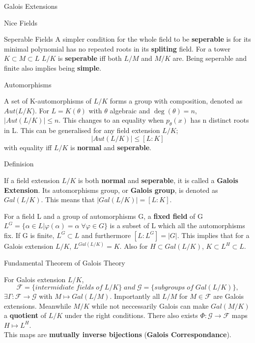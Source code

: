 \documentclass[12pt, letterpaper]{article}
\begin{document}
\begin{section}{Galois Extensions}
\begin{subsection}{Nice Fields}
\begin{subsubsection}{Seperable Fields}
      A simpler condition for the whole field to be \textbf{seperable} is for
      its minimal polynomial has no repeated roots in its \textbf{spliting}
      field. For a tower \(K \subset M \subset L\) \(L / K\) is \textbf{seperable}
      iff both \(L / M\) and \(M / K\) are. Being seperable and finite also
      implies being \textbf{simple}. \\

      \end{subsubsection}

  \end{subsection}

  \begin{subsection}{Automorphisms}

    A set of K-automorphisms of \(L / K\) forms a group with composition,
    denoted as \(Aut(L / K\)). For \(L = K(\theta)\) with \(\theta\) algebraic
    and \(\deg(\theta) = n\), \(|Aut(L / K)| \leq n\). This changes to an
    equality when \(p_{\theta}(x)\) has n distinct roots in L. This can be
    generalised for any field extension \(L / K\); \[|Aut(L / K)| \leq [L : K]\]
    with equality iff \(L / K\) is \textbf{normal} and \textbf{seperable}.

  \end{subsection}

  \begin{subsection}{Definision}

    If a field extension \(L / K\) is both \textbf{normal} and
    \textbf{seperable}, it is called a \textbf{Galois Extension}. Its
    automorphisms group, or \textbf{Galois group}, is denoted as \(Gal(L / K)\).
    This means that \(|Gal(L / K)| = [L : K]\).

    For a field L and a group of automorphisms G, a \textbf{fixed field} of G
    \(L^{G} = \{ \alpha \in L | \varphi(\alpha) = \alpha \; \forall \varphi \in
    G\}\) is a subset of L which all the automorphisms fix. If G is finite,
    \(L^{G} \subset L\) and furthermore \([L : L^{G}] = |G|\). This implies
    that for a Galois extension \(L / K\), \(L^{Gal(L / K)} = K\). Also for \(H
    \subset Gal(L / K)\), \(K \subset L^{H} \subset L\).

    \begin{subsubsection}{Fundamental Theorem of Galois Theory}

      For Galois extension \(L / K\), \[\mathcal{F} = \{ intermidiate \; fields
        \; of \; L / K \} \; and \; \mathcal{G} = \{ subgroups \; of \; Gal(L / K)
      \},\] \(\exists \Gamma : \mathcal{F} \to \mathcal{G}\) with \(M \mapsto
      Gal(L / M)\). Importantly all \(L / M\) for \(M \in \mathcal{F}\) are
      Galois extensions. Meanwhile \(M / K\) while not neccessarily Galois can
      make \(Gal(M / K)\) a \textbf{quotient} of \(L / K\) under the right
      conditions. There also exists \(\Phi: \mathcal{G} \to \mathcal{F}\)
      maps \(H \mapsto L^{H}\). \\
      This maps are \textbf{mutually inverse bijections} (\textbf{Galois
        Correspondance}).


\end{subsubsection}
\end{subsection}
\end{section}
\end{document}
